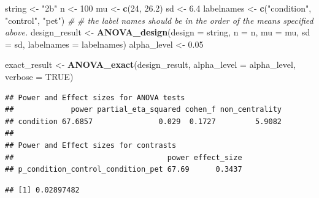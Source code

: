 \documentclass[]{book}
\newenvironment{Shaded}{\begin{snugshade}}{\end{snugshade}}
\newcommand{\CommentTok}[1]{\textcolor[rgb]{0.56,0.35,0.01}{\textit{#1}}}
\newcommand{\DataTypeTok}[1]{\textcolor[rgb]{0.13,0.29,0.53}{#1}}
\newcommand{\DecValTok}[1]{\textcolor[rgb]{0.00,0.00,0.81}{#1}}
\newcommand{\FloatTok}[1]{\textcolor[rgb]{0.00,0.00,0.81}{#1}}
\newcommand{\KeywordTok}[1]{\textcolor[rgb]{0.13,0.29,0.53}{\textbf{#1}}}
\newcommand{\NormalTok}[1]{#1}
\newcommand{\OperatorTok}[1]{\textcolor[rgb]{0.81,0.36,0.00}{\textbf{#1}}}
\newcommand{\OtherTok}[1]{\textcolor[rgb]{0.56,0.35,0.01}{#1}}
\newcommand{\StringTok}[1]{\textcolor[rgb]{0.31,0.60,0.02}{#1}}
\begin{document}
\begin{Shaded}
\begin{Highlighting}[]
\NormalTok{string <-}\StringTok{ "2b"}
\NormalTok{n <-}\StringTok{ }\DecValTok{100}
\NormalTok{mu <-}\StringTok{ }\KeywordTok{c}\NormalTok{(}\DecValTok{24}\NormalTok{, }\FloatTok{26.2}\NormalTok{)}
\NormalTok{sd <-}\StringTok{ }\FloatTok{6.4}
\NormalTok{labelnames <-}\StringTok{ }\KeywordTok{c}\NormalTok{(}\StringTok{"condition"}\NormalTok{, }\StringTok{"control"}\NormalTok{, }\StringTok{"pet"}\NormalTok{) }\CommentTok{#}
\CommentTok{# the label names should be in the order of the means specified above.}
\NormalTok{design_result <-}\StringTok{ }\KeywordTok{ANOVA_design}\NormalTok{(}\DataTypeTok{design =}\NormalTok{ string,}
                              \DataTypeTok{n =}\NormalTok{ n,}
                              \DataTypeTok{mu =}\NormalTok{ mu,}
                              \DataTypeTok{sd =}\NormalTok{ sd,}
                              \DataTypeTok{labelnames =}\NormalTok{ labelnames)}
\NormalTok{alpha_level <-}\StringTok{ }\FloatTok{0.05}

\NormalTok{exact_result <-}\StringTok{ }\KeywordTok{ANOVA_exact}\NormalTok{(design_result,}
                            \DataTypeTok{alpha_level =}\NormalTok{ alpha_level,}
                            \DataTypeTok{verbose =} \OtherTok{TRUE}\NormalTok{)}
\end{Highlighting}
\end{Shaded}

\begin{verbatim}
## Power and Effect sizes for ANOVA tests
##             power partial_eta_squared cohen_f non_centrality
## condition 67.6857               0.029  0.1727         5.9082
## 
## Power and Effect sizes for contrasts
##                                   power effect_size
## p_condition_control_condition_pet 67.69      0.3437
\end{verbatim}

\begin{Shaded}
\end{Shaded}

\begin{verbatim}
## [1] 0.02897482
\end{verbatim}

\begin{Shaded}
\end{Shaded}
\end{document}
